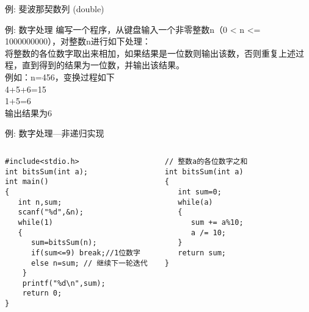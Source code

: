 \begin{frame}{例: 斐波那契数列 (double)}
\vspace{-0.3cm}
\end{frame}

\begin{frame}{例: 数字处理}
编写一个程序，从键盘输入一个非零整数n（0 < n <= 1000000000），对整数n进行如下处理：\\
将整数的各位数字取出来相加，如果结果是一位数则输出该数，否则重复上述过程，直到得到的结果为一位数，并输出该结果。\\
例如：n=456，变换过程如下\\
4+5+6=15\\
1+5=6\\
输出结果为6
\end{frame}

\begin{frame}{例: 数字处理---非递归实现}
\vspace{-0.3cm}
\begin{columns}[T]
\begin{lstlisting}
#include<stdio.h>
int bitsSum(int a);
int main()
{
   int n,sum;
   scanf("%d",&n);
   while(1)
   {
      sum=bitsSum(n);
      if(sum<=9) break;//1位数字
      else n=sum; // 继续下一轮迭代 
    }
    printf("%d\n",sum); 
    return 0;
}
\end{lstlisting}
\begin{lstlisting}[frame=leftline]
// 整数a的各位数字之和
int bitsSum(int a)
{
   int sum=0;
   while(a)
   {
      sum += a%10;
      a /= 10;
   }
   return sum;
}
\end{lstlisting}
\end{columns}
~\\
\end{frame}


